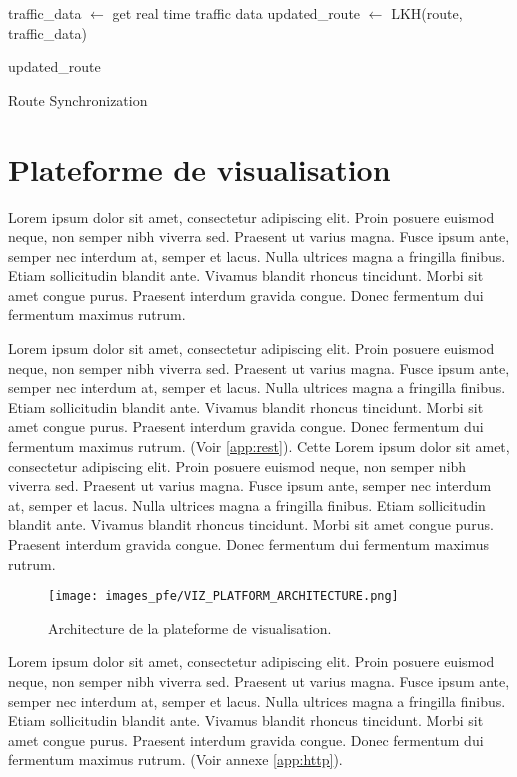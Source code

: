 \medskip

\begin{algorithm}[H]
  traffic\_data $\gets$ get real time traffic data \;
  updated\_route $\gets$ LKH(route, traffic\_data) \;

  \Return updated\_route \;
  \caption{Route Synchronization}
  \label{alg:sync}
\end{algorithm}
\FloatBarrier

\medskip

\section{Plateforme de visualisation}
Lorem ipsum dolor sit amet, consectetur adipiscing elit. Proin posuere euismod neque, non semper nibh viverra sed. Praesent ut varius magna. Fusce ipsum ante, semper nec interdum at, semper et lacus. Nulla ultrices magna a fringilla finibus. Etiam sollicitudin blandit ante. Vivamus blandit rhoncus tincidunt. Morbi sit amet congue purus. Praesent interdum gravida congue. Donec fermentum dui fermentum maximus rutrum.

\medskip

Lorem ipsum dolor sit amet, consectetur adipiscing elit. Proin posuere euismod neque, non semper nibh viverra sed. Praesent ut varius magna. Fusce ipsum ante, semper nec interdum at, semper et lacus. Nulla ultrices magna a fringilla finibus. Etiam sollicitudin blandit ante. Vivamus blandit rhoncus tincidunt. Morbi sit amet congue purus. Praesent interdum gravida congue. Donec fermentum dui fermentum maximus rutrum. (Voir \ref{app:rest}). Cette Lorem ipsum dolor sit amet, consectetur adipiscing elit. Proin posuere euismod neque, non semper nibh viverra sed. Praesent ut varius magna. Fusce ipsum ante, semper nec interdum at, semper et lacus. Nulla ultrices magna a fringilla finibus. Etiam sollicitudin blandit ante. Vivamus blandit rhoncus tincidunt. Morbi sit amet congue purus. Praesent interdum gravida congue. Donec fermentum dui fermentum maximus rutrum.

\medskip

\begin{figure}[hbt!]
  \centering
  \texttt{[image: images\_pfe/VIZ\_PLATFORM\_ARCHITECTURE.png]}
  \caption{Architecture de la plateforme de visualisation.}
  \label{fig:viz-platform-architecture}
\end{figure}
\FloatBarrier

Lorem ipsum dolor sit amet, consectetur adipiscing elit. Proin posuere euismod neque, non semper nibh viverra sed. Praesent ut varius magna. Fusce ipsum ante, semper nec interdum at, semper et lacus. Nulla ultrices magna a fringilla finibus. Etiam sollicitudin blandit ante. Vivamus blandit rhoncus tincidunt. Morbi sit amet congue purus. Praesent interdum gravida congue. Donec fermentum dui fermentum maximus rutrum. (Voir annexe \ref{app:http}).


